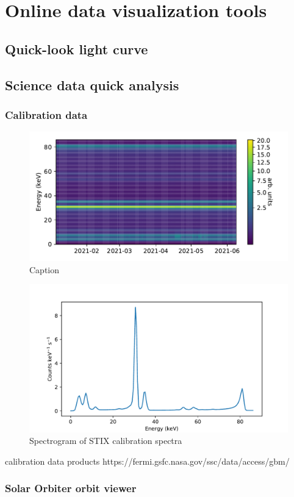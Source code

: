 \documentclass{aa}
\begin{document}
\section{Online data visualization tools}
\subsection{Quick-look light curve}
\subsection{Science data quick analysis}
\subsubsection{Calibration data}
\begin{figure}
    \centering
    \includegraphics[width=0.8\linewidth]{figures/calibrationSpectrogram.pdf}
    \caption{Caption}
    \label{fig:calibrationSpectrum}
\end{figure}
\begin{figure}
    \centering
    \includegraphics[width=0.8\linewidth]{figures/calibrationSpectrum.pdf}
    \caption{Spectrogram of STIX calibration spectra}
    \label{fig:calibrationSpectrogram}
\end{figure}

calibration data products
https://fermi.gsfc.nasa.gov/ssc/data/access/gbm/
\subsubsection{Solar Orbiter orbit viewer}
\end{document}
